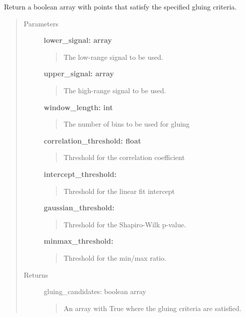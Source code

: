 \documentclass[letterpaper,10pt,english]{sphinxmanual}
\begin{document}
\begin{fulllineitems}
\label{pre_processing:pre_processing.get_gluing_candidates}
Return a boolean array with points that satisfy the specified gluing criteria.
\begin{quote}\begin{description}
\item[{Parameters}] \leavevmode
\textbf{lower\_signal: array}
\begin{quote}

The low-range signal to be used.
\end{quote}

\textbf{upper\_signal: array}
\begin{quote}

The high-range signal to be used.
\end{quote}

\textbf{window\_length: int}
\begin{quote}

The number of bins to be used for gluing
\end{quote}

\textbf{correlation\_threshold: float}
\begin{quote}

Threshold for the correlation coefficient
\end{quote}

\textbf{intercept\_threshold:}
\begin{quote}

Threshold for the linear fit intercept
\end{quote}

\textbf{gaussian\_threshold:}
\begin{quote}

Threshold for the Shapiro-Wilk p-value.
\end{quote}

\textbf{minmax\_threshold:}
\begin{quote}

Threshold for the min/max ratio.
\end{quote}

\item[{Returns}] \leavevmode
gluing\_candidates: boolean array
\begin{quote}

An array with True where the gluing criteria are satisfied.
\end{quote}

\end{description}\end{quote}

\end{fulllineitems}
\end{document}

